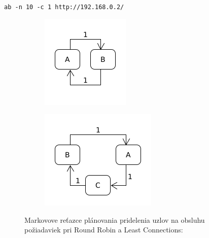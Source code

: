 \documentclass[12pt, a4paper]{article}
\begin{document}
\begin{lrbox}{\shield}
\verb|ab -n 10 -c 1 http://192.168.0.2/|
\end{lrbox}
\begin{figure}[h!]
	\centering
	\begin{subfigure}[t]{.25\textwidth}
  		\centering
  		\includegraphics[width=\textwidth]{images/10-uzly-2.png}
	\end{subfigure}
	\begin{subfigure}[t]{.25\textwidth}
  		\centering
  		\includegraphics[width=\textwidth]{images/10-uzly-3.png}
	\end{subfigure}
	\caption{Markovove reťazce plánovania pridelenia uzlov na obsluhu požiadaviek
	pri Round Robin a Least Connections: \usebox{\shield}}
\end{figure}
\end{document}
